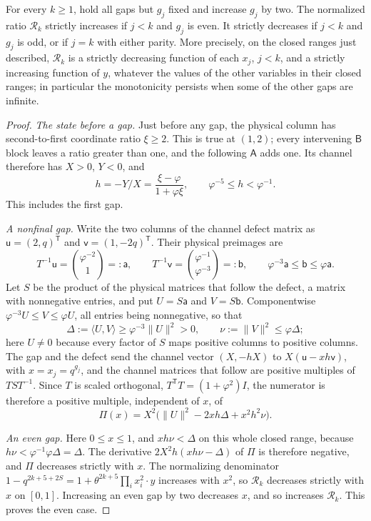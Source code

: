 \begin{theorem}
\label{thm:tail-parity}
For every $k\geqslant1$, hold all gaps but $g_j$ fixed and increase $g_j$
by two. The normalized ratio $\mathcal R_k$ strictly increases if $j<k$
and $g_j$ is even. It strictly decreases if $j<k$ and $g_j$ is odd, or
if $j=k$ with either parity. More precisely, on the closed ranges just
described, $\mathcal R_k$ is a strictly decreasing function of each $x_j$,
$j<k$, and a strictly increasing function of $y$, whatever the values of the
other variables in their closed ranges; in particular the monotonicity
persists when some of the other gaps are infinite.
\end{theorem}

\begin{proof}
\emph{The state before a gap.} Just before any gap, the physical
column has second-to-first coordinate ratio $\xi\geqslant2$. This is true at
$(1,2)$; every intervening $\mathsf B$ block leaves a ratio greater than one,
and the following $\mathsf A$ adds one. Its channel therefore has $X>0$,
$Y<0$, and
$$
 h=-Y/X=\frac{\xi-\varphi}{1+\varphi\xi},\qquad
 \varphi^{-5}\leqslant h<\varphi^{-1}.
$$
This includes the first gap.

\emph{A nonfinal gap.} Write the two columns of the channel defect matrix as
$\mathsf u=(2,q)^{\mathsf T}$ and $\mathsf v=(1,-2q)^{\mathsf T}$. Their
physical preimages are
$$
 T^{-1}\mathsf u=\binom{\varphi^{-2}}1=:\mathsf a,
 \qquad T^{-1}\mathsf v=\binom{\varphi^{-1}}{\varphi^{-3}}=:\mathsf b,
 \qquad \varphi^{-3}\mathsf a\leqslant\mathsf b\leqslant\varphi\mathsf a.
$$
Let $S$ be the product of the physical matrices that follow the defect, a
matrix with nonnegative entries, and put $U=S\mathsf a$ and $V=S\mathsf b$.
Componentwise $\varphi^{-3}U\leqslant V\leqslant\varphi U$, all entries being
nonnegative, so that
$$
 \Delta:=\langle U,V\rangle\geqslant\varphi^{-3}\lVert U\rVert^2>0,
 \qquad \nu:=\lVert V\rVert^2\leqslant\varphi\Delta ;
$$
here $U\neq0$ because every factor of $S$ maps positive columns to positive
columns. The gap and the defect send the channel vector $(X,-hX)$ to
$X(\mathsf u-xh\mathsf v)$, with $x=x_j=q^{g_j}$, and the channel matrices that
follow are positive multiples of $TST^{-1}$. Since $T$ is scaled orthogonal,
$T^{\mathsf T}T=(1+\varphi^2)I$, the numerator is therefore a positive multiple,
independent of $x$, of
$$
 \Pi(x)=X^2\bigl(\lVert U\rVert^2-2xh\Delta+x^2h^2\nu\bigr).
$$

\emph{An even gap.} Here $0\leqslant x\leqslant1$, and $xh\nu<\Delta$ on this
whole closed range, because $h\nu<\varphi^{-1}\varphi\Delta=\Delta$. The
derivative $2X^2h(xh\nu-\Delta)$ of $\Pi$ is therefore negative, and $\Pi$
decreases strictly with $x$. The normalizing denominator
$1-q^{2k+5+2S}=1+\theta^{2k+5}\prod_ix_i^2\cdot y$ increases with $x^2$, so
$\mathcal R_k$ decreases strictly with $x$ on $[0,1]$. Increasing an even gap
by two decreases $x$, and so increases $\mathcal R_k$. This proves the even
case.


\end{proof}
